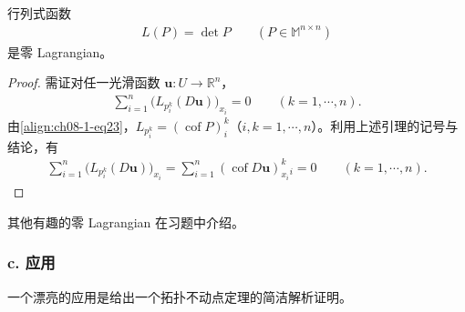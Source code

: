 \documentclass[../../main.tex]{subfiles}
\begin{document}
\begin{theorem}\label{theorem:ch08-1-2-行列式零Lagrangian}
行列式函数
\begin{align*}
L(P)=\det P\qquad (P\in\mathbb{M}^{n\times n})
\end{align*}
是零 Lagrangian。
\begin{proof}
需证对任一光滑函数 $\mathbf{u}:U\to\mathbb{R}^n$，
\begin{align*}
\sum_{i=1}^n\big(L_{p_i^k}(D\mathbf{u})\big)_{x_i}=0\qquad (k=1,\cdots,n).
\end{align*}
由\eqref{align:ch08-1-eq23}，$L_{p_i^k}=(\operatorname{cof}P)_i^k$（$i,k=1,\cdots,n$）。利用上述引理的记号与结论，有
\begin{align*}
\sum_{i=1}^n\big(L_{p_i^k}(D\mathbf{u})\big)_{x_i}=\sum_{i=1}^n(\operatorname{cof}D\mathbf{u})_{x_i}^k{}_i=0\qquad (k=1,\cdots,n).
\end{align*}
\end{proof}
\end{theorem}

其他有趣的零 Lagrangian 在习题中介绍。

\subsubsection*{c. 应用}

一个漂亮的应用是给出一个拓扑不动点定理的简洁解析证明。
\end{document}
